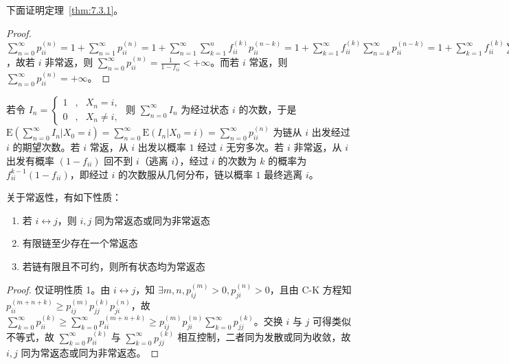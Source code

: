 \documentclass[../main.tex]{subfiles}
\begin{document}
下面证明定理~\ref{thm:7.3.1}。

\begin{proof}
    $\sum_{n=0}^\infty p_{ii}^{(n)}=1+\sum_{n=1}^\infty p_{ii}^{(n)}=1+\sum_{n=1}^\infty\sum_{k=1}^nf_{ii}^{(k)}p_{ii}^{(n-k)}=1+\sum_{k=1}^\infty f_{ii}^{(k)}\sum_{n=k}^\infty p_{ii}^{(n-k)}=1+\sum_{k=1}^\infty f_{ii}^{(k)}\sum_{n=0}^\infty p_{ii}^{(n)}=1+f_{ii}\sum_{n=0}^\infty p_{ii}^{(n)}$，故若 $i$ 非常返，则 $\sum_{n=0}^\infty p_{ii}^{(n)}=\frac1{1-f_{ii}}<+\infty$。而若 $i$ 常返，则 $\sum_{n=0}^\infty p_{ii}^{(n)}=+\infty$。
\end{proof}

若令 $I_n=\left\{\begin{aligned}
        1 & , & X_n=i,     \\
        0 & , & X_n\neq i,
    \end{aligned}\right.$ 则 $\sum_{n=0}^\infty I_n$ 为经过状态 $i$ 的次数，于是 $\mathrm E(\sum_{n=0}^\infty I_n|X_0=i)=\sum_{n=0}^\infty\mathrm E(I_n|X_0=i)=\sum_{n=0}^\infty p_{ii}^{(n)}$ 为链从 $i$ 出发经过 $i$ 的期望次数。若 $i$ 常返，从 $i$ 出发以概率 $1$ 经过 $i$ 无穷多次。若 $i$ 非常返，从 $i$ 出发有概率 $(1-f_{ii})$ 回不到 $i$（逃离 $i$），经过 $i$ 的次数为 $k$ 的概率为 $f_{ii}^{k-1}(1-f_{ii})$，即经过 $i$ 的次数服从几何分布，链以概率 $1$ 最终逃离 $i$。

\begin{theorem}\label{thm:7.3.2}
    关于常返性，有如下性质：
    \begin{enumerate}
        \item 若 $i\leftrightarrow j$，则 $i,j$ 同为常返态或同为非常返态
        \item 有限链至少存在一个常返态
        \item 若链有限且不可约，则所有状态均为常返态
    \end{enumerate}
\end{theorem}

\begin{proof}
    仅证明性质 1。由 $i\leftrightarrow j$，知 $\exists m,n,p_{ij}^{(m)}>0,p_{ji}^{(n)}>0$，且由 C-K 方程知 $p_{ii}^{(m+n+k)}\geq p_{ij}^{(m)}p_{jj}^{(k)}p_{ji}^{(n)}$，故 $\sum_{k=0}^\infty p_{ii}^{(k)}\geq\sum_{k=0}^\infty p_{ii}^{(m+n+k)}\geq p_{ij}^{(m)}p_{ji}^{(n)}\sum_{k=0}^\infty p_{jj}^{(k)}$。交换 $i$ 与 $j$ 可得类似不等式，故 $\sum_{k=0}^\infty p_{ii}^{(k)}$ 与 $\sum_{k=0}^\infty p_{jj}^{(k)}$ 相互控制，二者同为发散或同为收敛，故 $i,j$ 同为常返态或同为非常返态。
\end{proof}
\end{document}

